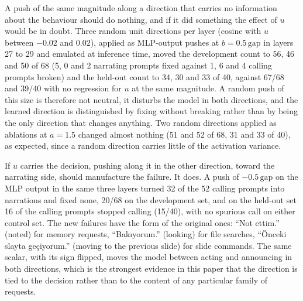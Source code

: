 \documentclass[11pt]{article}
\begin{document}
A push of the same magnitude along a direction that carries no information about the behaviour should do nothing, and if it did something the effect of $u$ would be in doubt. Three random unit directions per layer (cosine with $u$ between $-0.02$ and $0.02$), applied as MLP-output pushes at $b = 0.5\,\mathrm{gap}$ in layers 27 to 29 and emulated at inference time, moved the development count to 56, 46 and 50 of 68 (5, 0 and 2 narrating prompts fixed against 1, 6 and 4 calling prompts broken) and the held-out count to 34, 30 and 33 of 40, against 67/68 and 39/40 with no regression for $u$ at the same magnitude. A random push of this size is therefore not neutral, it disturbs the model in both directions, and the learned direction is distinguished by fixing without breaking rather than by being the only direction that changes anything. Two random directions applied as ablations at $a=1.5$ changed almost nothing (51 and 52 of 68, 31 and 33 of 40), as expected, since a random direction carries little of the activation variance.

If $u$ carries the decision, pushing along it in the other direction, toward the narrating side, should manufacture the failure. It does. A push of $-0.5\,\mathrm{gap}$ on the MLP output in the same three layers turned 32 of the 52 calling prompts into narrations and fixed none, 20/68 on the development set, and on the held-out set 16 of the calling prompts stopped calling (15/40), with no spurious call on either control set. The new failures have the form of the original ones: ``Not ettim.'' (noted) for memory requests, ``Bakıyorum.'' (looking) for file searches, ``Önceki slayta geçiyorum.'' (moving to the previous slide) for slide commands. The same scalar, with its sign flipped, moves the model between acting and announcing in both directions, which is the strongest evidence in this paper that the direction is tied to the decision rather than to the content of any particular family of requests.
\end{document}
